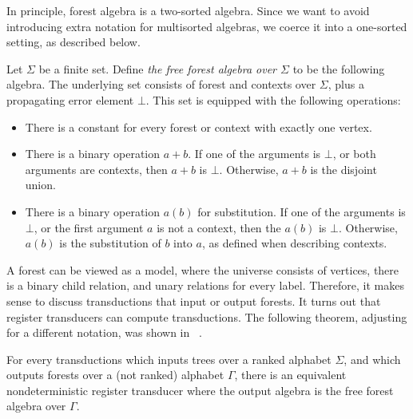 In principle, forest algebra is a two-sorted algebra. Since we want to avoid introducing extra notation for multisorted algebras, we coerce it into a one-sorted setting, as described below. 
\newcommand{\forsort}{\mathrm{for}}
\newcommand{\consort}{\mathrm{con}}
\begin{definition}
    Let $\Sigma$ be a finite set. Define \emph{the free forest algebra over $\Sigma$} to be the following algebra. The underlying set consists of forest and contexts  over $\Sigma$, plus a propagating error element $\bot$.  This set is equipped with  the following operations:
    \begin{itemize}
        \item There is a constant for every forest or context with exactly one vertex.
        \item There is a binary operation $a + b$. If one of the arguments is $\bot$, or both arguments are contexts, then $a+ b$ is $\bot$.  Otherwise, $a+b$ is the disjoint union.
        \item There is a binary operation $a(b)$ for substitution. If one of the arguments is $\bot$, or the first argument $a$ is not a context, then the $a(b)$ is $\bot$. Otherwise, $a(b)$ is the substitution of $b$ into $a$, as defined when describing contexts. 
    \end{itemize}
\end{definition}


A forest can be viewed as a model, where the universe consists of vertices, there is a binary child relation, and unary relations for every label. Therefore, it makes sense to discuss \mso transductions that input or output forests.  It turns out that register transducers can compute \mso transductions. The following theorem,  adjusting for a different notation, was shown in ~\cite[Theorem 4.6]{alurStreamingTreeTransducers2017}.
\begin{theorem}\label{thm:alur-tree}
    For every \mso transductions which inputs trees over a ranked alphabet $\Sigma$, and which outputs forests over a (not ranked) alphabet $\Gamma$, there is an equivalent nondeterministic register transducer where the output algebra is the free forest algebra over $\Gamma$.
\end{theorem}






